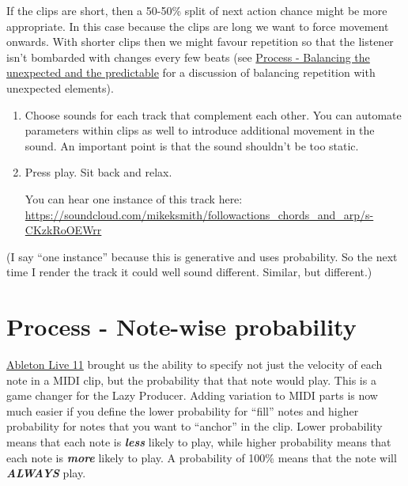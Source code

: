\documentclass[
  12pt,
  letterpaper,
  oneside,
  open=any]{scrbook}
\begin{document}
If the clips are short, then a 50-50\% split of next action chance might
be more appropriate. In this case because the clips are long we want to
force movement onwards. With shorter clips then we might favour
repetition so that the listener isn't bombarded with changes every few
beats (see
\hyperref[Chapter-009-Process-Balance_unexpected_and_predictable]{Process
- Balancing the unexpected and the predictable} for a discussion of
balancing repetition with unexpected elements).

\begin{enumerate}
\def\labelenumi{\arabic{enumi}.}
\setcounter{enumi}{7}
\item
  Choose sounds for each track that complement each other. You can
  automate parameters within clips as well to introduce additional
  movement in the sound. An important point is that the sound shouldn't
  be too static.
\item
  Press play. Sit back and relax.

  You can hear one instance of this track here:
  \href{https://soundcloud.com/mikeksmith/followactions_chords_and_arp/s-CKzkRoOEWrr?in=mikeksmith/sets/the-lazy-producer-recipes/s-PGMEWqfwKGz&si=e1846c9235ff47ad9ae0fa0cd5d52708&utm_source=clipboard&utm_medium=text&utm_campaign=social_sharing}{https://soundcloud.com/mikeksmith/followactions\_chords\_and\_arp/s-CKzkRoOEWrr}
\end{enumerate}

(I say ``one instance'' because this is generative and uses probability.
So the next time I render the track it could well sound different.
Similar, but different.)


\chapter{Process - Note-wise
probability}\label{Chapter-002-Process-Note_wise_probability}

\href{https://www.ableton.com/en/live-manual/11/welcome-to-live/\#welcome-to-live}{Ableton
Live 11} brought us the ability to specify not just the velocity of each
note in a MIDI clip, but the probability that that note would play. This
is a game changer for the Lazy Producer. Adding variation to MIDI parts
is now much easier if you define the lower probability for ``fill''
notes and higher probability for notes that you want to ``anchor'' in
the clip. Lower probability means that each note is \textbf{\emph{less}}
likely to play, while higher probability means that each note is
\textbf{\emph{more}} likely to play. A probability of 100\% means that
the note will \textbf{\emph{ALWAYS}} play.
\end{document}

